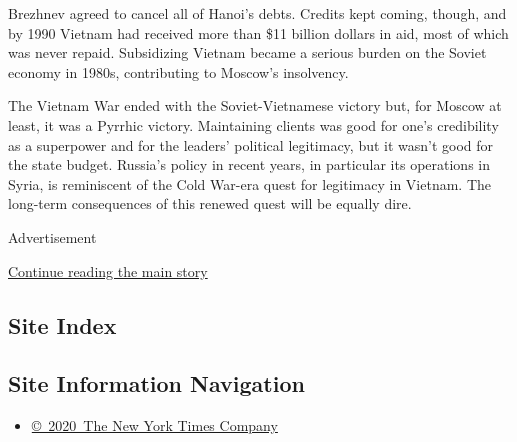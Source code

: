 Brezhnev agreed to cancel all of Hanoi's debts. Credits kept coming,
though, and by 1990 Vietnam had received more than \$11 billion dollars
in aid, most of which was never repaid. Subsidizing Vietnam became a
serious burden on the Soviet economy in 1980s, contributing to Moscow's
insolvency.

The Vietnam War ended with the Soviet-Vietnamese victory but, for Moscow
at least, it was a Pyrrhic victory. Maintaining clients was good for
one's credibility as a superpower and for the leaders' political
legitimacy, but it wasn't good for the state budget. Russia's policy in
recent years, in particular its operations in Syria, is reminiscent of
the Cold War-era quest for legitimacy in Vietnam. The long-term
consequences of this renewed quest will be equally dire.

Advertisement

\protect\hyperlink{after-bottom}{Continue reading the main story}

\hypertarget{site-index}{%
\subsection{Site Index}\label{site-index}}

\hypertarget{site-information-navigation}{%
\subsection{Site Information
Navigation}\label{site-information-navigation}}

\begin{itemize}
\tightlist
\item
  \href{https://help.nytimes.com/hc/en-us/articles/115014792127-Copyright-notice}{©~2020~The
  New York Times Company}
\end{itemize}

